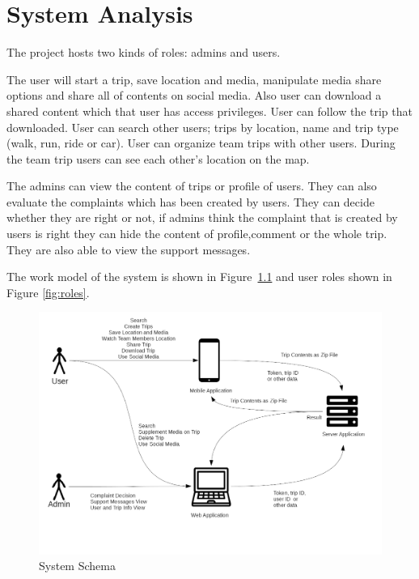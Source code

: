 \chapter{System Analysis}

The project hosts two kinds of roles: admins and users. 

The user will start a trip, save location and media, manipulate media share options and share all of contents on social media. Also user can download a shared content which that user has access privileges. User can follow the trip that downloaded. User can search other users; trips by location, name and trip type (walk, run, ride or car). User can organize team trips with other users. During the team trip users can see each other's location on the map.

The admins can view the content of trips or profile of users. They can also evaluate the complaints which has been created by users. They can decide whether they are right or not, if admins think the complaint that is created by users is right they can hide the content of profile,comment or the whole trip. They are also able to view the support messages.

The work model of the system is shown in Figure~\ref{fig:system_diagram} and user roles shown in Figure \ref{fig:roles}.

\begin{figure}[!htbp]
\centering
\includegraphics[width=\textwidth]{projectChapters/images/system_diagram.png}
\caption{System Schema}
\label{fig:system_diagram}
\end{figure}

